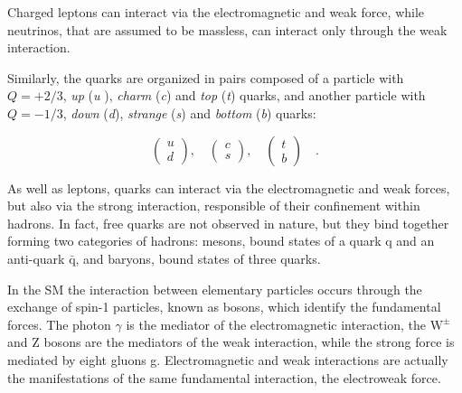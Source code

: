 Charged leptons can interact via the electromagnetic and weak force, while neutrinos, that are assumed to be massless, can interact only through the weak interaction.

Similarly, the quarks are organized in pairs composed of a particle with $Q=+2/3$, \emph{up} (\emph{u
}), \emph{charm} (\emph{c}) and \emph{top} (\emph{t}) quarks, and another particle with $Q=-1/3$, \emph{down} (\emph{d}), \emph{strange} (\emph{s}) and \emph{bottom} (\emph{b}) quarks:

\begin{equation}
\label{eq:leptons}
\begin{pmatrix} u       \\ d      \end{pmatrix}, \quad
\begin{pmatrix} c       \\ s      \end{pmatrix}, \quad
\begin{pmatrix} t       \\ b      \end{pmatrix}  \quad .
\end{equation}

As well as leptons, quarks can interact via the electromagnetic and weak forces, but also via the strong interaction, responsible of their confinement within hadrons. In fact, free quarks are not observed in nature, but they bind together forming two categories of hadrons: mesons, bound states of a quark q and an anti-quark $\mathrm{\bar{q}}$, and baryons, bound states of three quarks.

In the SM the interaction between elementary particles occurs through the exchange of spin-1 particles, known as bosons, which identify the fundamental forces. The photon $\gamma$ is the mediator of the electromagnetic interaction, the $\mathrm{W^{\pm}}$ and Z bosons are the mediators of the weak interaction, while the strong force is mediated by eight gluons g. Electromagnetic and weak interactions are actually the manifestations of the same fundamental interaction, the electroweak force.

